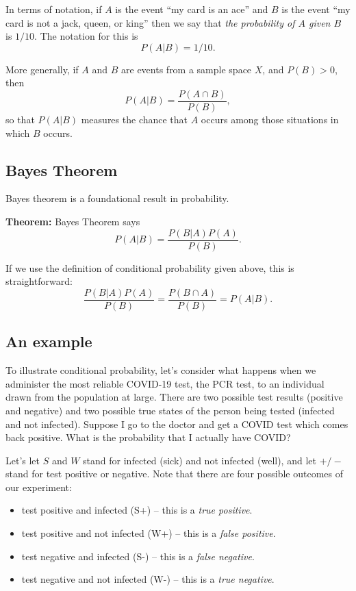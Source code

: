 \documentclass[
  11pt,
  letterpaper,
]{scrbook}
\providecommand{\tightlist}{%
  \setlength{\itemsep}{0pt}\setlength{\parskip}{0pt}}\usepackage{longtable,booktabs,array}
\theoremstyle{plain}
\theoremstyle{plain}
\theoremstyle{remark}
\begin{document}
In terms of notation, if \(A\) is the event ``my card is an ace'' and
\(B\) is the event ``my card is not a jack, queen, or king'' then we say
that \emph{the probability of \(A\) given \(B\)} is \(1/10\). The
notation for this is \[
P(A|B) = 1/10.
\]

More generally, if \(A\) and \(B\) are events from a sample space \(X\),
and \(P(B)>0\), then \[
P(A|B) = \frac{P(A\cap B)}{P(B)},
\] so that \(P(A|B)\) measures the chance that \(A\) occurs among those
situations in which \(B\) occurs.

\hypertarget{bayes-theorem}{%
\subsection{Bayes Theorem}\label{bayes-theorem}}

Bayes theorem is a foundational result in probability.

\textbf{Theorem:} Bayes Theorem says \[
P(A|B) = \frac{P(B|A)P(A)}{P(B)}.
\]

If we use the definition of conditional probability given above, this is
straightforward: \[
\frac{P(B|A)P(A)}{P(B)} = \frac{P(B\cap A)}{P(B)} = P(A|B).
\]

\hypertarget{an-example}{%
\subsection{An example}\label{an-example}}

To illustrate conditional probability, let's consider what happens when
we administer the most reliable COVID-19 test, the PCR test, to an
individual drawn from the population at large. There are two possible
test results (positive and negative) and two possible true states of the
person being tested (infected and not infected). Suppose I go to the
doctor and get a COVID test which comes back positive. What is the
probability that I actually have COVID?

Let's let \(S\) and \(W\) stand for infected (sick) and not infected
(well), and let \(+/-\) stand for test positive or negative. Note that
there are four possible outcomes of our experiment:

\begin{itemize}
\tightlist
\item
  test positive and infected (S+) -- this is a \emph{true positive}.
\item
  test positive and not infected (W+) -- this is a \emph{false
  positive}.
\item
  test negative and infected (S-) -- this is a \emph{false negative}.
\item
  test negative and not infected (W-) -- this is a \emph{true negative}.
\end{itemize}
\end{document}
